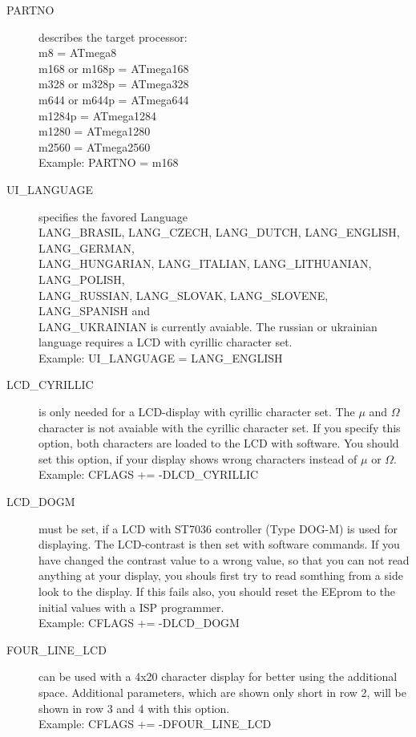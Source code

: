 \begin{description}
  \item[PARTNO] describes the target processor:\\
         m8 = ATmega8\\
         m168 or m168p = ATmega168\\
         m328 or m328p = ATmega328\\
         m644 or m644p = ATmega644\\
         m1284p        = ATmega1284\\
         m1280         = ATmega1280\\
         m2560         = ATmega2560\\
    Example:  PARTNO = m168
   \item[UI\_LANGUAGE] specifies the favored Language\\
    LANG\_BRASIL, LANG\_CZECH, LANG\_DUTCH, LANG\_ENGLISH, LANG\_GERMAN, \\
    LANG\_HUNGARIAN, LANG\_ITALIAN, LANG\_LITHUANIAN, LANG\_POLISH, \\
    LANG\_RUSSIAN, LANG\_SLOVAK, LANG\_SLOVENE, LANG\_SPANISH  and \\
    LANG\_UKRAINIAN is currently avaiable.
 The russian or ukrainian language requires a LCD with cyrillic character set.\\
    Example:  UI\_LANGUAGE = LANG\_ENGLISH

  \item[LCD\_CYRILLIC] is only needed for a LCD-display with cyrillic character set. The \(\mu\) and \(\Omega\) character
is not avaiable with the cyrillic character set.
If you specify this option, both characters are loaded to the LCD with software.
You should set this option, if your display shows wrong characters instead of \(\mu\) or \(\Omega\).\\
Example: CFLAGS += -DLCD\_CYRILLIC

 \item[LCD\_DOGM] must be set, if a LCD with ST7036 controller (Type DOG-M) is used for displaying.
The LCD-contrast is then set with software commands.
If you have changed the contrast value to a wrong value, so that you can not read anything at your display,
you shouls first try to read somthing from a side look to the display.
If this fails also, you should reset the EEprom to the initial values with a ISP programmer.\\
Example: CFLAGS += -DLCD\_DOGM

 \item[FOUR\_LINE\_LCD] can be used with a 4x20 character display for better using the additional space.
Additional parameters, which are shown only short in row 2, will be shown in row 3 and 4 with this option.\\
Example: CFLAGS += -DFOUR\_LINE\_LCD


\end{description}
